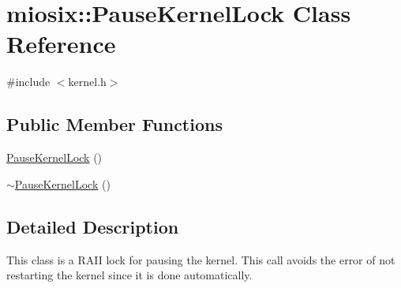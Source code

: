 \hypertarget{classmiosix_1_1_pause_kernel_lock}{\section{miosix\-:\-:Pause\-Kernel\-Lock Class Reference}
\label{classmiosix_1_1_pause_kernel_lock}
}


{\ttfamily \#include $<$kernel.\-h$>$}

\subsection*{Public Member Functions}
\begin{DoxyCompactItemize}
\item 
\hyperlink{classmiosix_1_1_pause_kernel_lock_a6666bc670b9eb36ce7797b9b231e4bf8}{Pause\-Kernel\-Lock} ()
\item 
\hyperlink{classmiosix_1_1_pause_kernel_lock_a0980986878a2bc171af039d70a1e9e7a}{$\sim$\-Pause\-Kernel\-Lock} ()
\end{DoxyCompactItemize}


\subsection{Detailed Description}
This class is a R\-A\-I\-I lock for pausing the kernel. This call avoids the error of not restarting the kernel since it is done automatically. 

